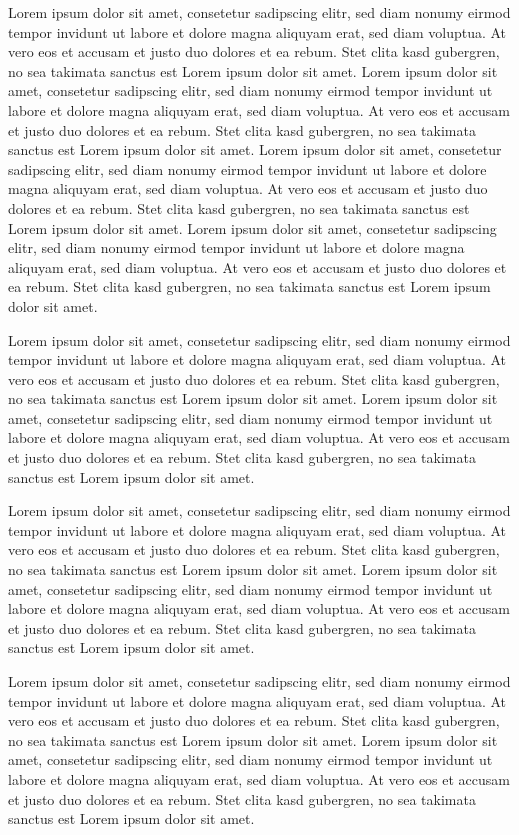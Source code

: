 \documentclass[11pt,a4paper]{article} %
\begin{document}
Lorem ipsum dolor sit amet, consetetur sadipscing elitr, sed diam nonumy eirmod tempor invidunt ut labore et dolore magna aliquyam erat, sed diam voluptua. At vero eos et accusam et justo duo dolores et ea rebum. Stet clita kasd gubergren, no sea takimata sanctus est Lorem ipsum dolor sit amet. Lorem ipsum dolor sit amet, consetetur sadipscing elitr, sed diam nonumy eirmod tempor invidunt ut labore et dolore magna aliquyam erat, sed diam voluptua. At vero eos et accusam et justo duo dolores et ea rebum. Stet clita kasd gubergren, no sea takimata sanctus est Lorem ipsum dolor sit amet. Lorem ipsum dolor sit amet, consetetur sadipscing elitr, sed diam nonumy eirmod tempor invidunt ut labore et dolore magna aliquyam erat, sed diam voluptua. At vero eos et accusam et justo duo dolores et ea rebum. Stet clita kasd gubergren, no sea takimata sanctus est Lorem ipsum dolor sit amet. Lorem ipsum dolor sit amet, consetetur sadipscing elitr, sed diam nonumy eirmod tempor invidunt ut labore et dolore magna aliquyam erat, sed diam voluptua. At vero eos et accusam et justo duo dolores et ea rebum. Stet clita kasd gubergren, no sea takimata sanctus est Lorem ipsum dolor sit amet. 

Lorem ipsum dolor sit amet, consetetur sadipscing elitr, sed diam nonumy eirmod tempor invidunt ut labore et dolore magna aliquyam erat, sed diam voluptua. At vero eos et accusam et justo duo dolores et ea rebum. Stet clita kasd gubergren, no sea takimata sanctus est Lorem ipsum dolor sit amet. Lorem ipsum dolor sit amet, consetetur sadipscing elitr, sed diam nonumy eirmod tempor invidunt ut labore et dolore magna aliquyam erat, sed diam voluptua. At vero eos et accusam et justo duo dolores et ea rebum. Stet clita kasd gubergren, no sea takimata sanctus est Lorem ipsum dolor sit amet. 

Lorem ipsum dolor sit amet, consetetur sadipscing elitr, sed diam nonumy eirmod tempor invidunt ut labore et dolore magna aliquyam erat, sed diam voluptua. At vero eos et accusam et justo duo dolores et ea rebum. Stet clita kasd gubergren, no sea takimata sanctus est Lorem ipsum dolor sit amet. Lorem ipsum dolor sit amet, consetetur sadipscing elitr, sed diam nonumy eirmod tempor invidunt ut labore et dolore magna aliquyam erat, sed diam voluptua. At vero eos et accusam et justo duo dolores et ea rebum. Stet clita kasd gubergren, no sea takimata sanctus est Lorem ipsum dolor sit amet. 

Lorem ipsum dolor sit amet, consetetur sadipscing elitr, sed diam nonumy eirmod tempor invidunt ut labore et dolore magna aliquyam erat, sed diam voluptua. At vero eos et accusam et justo duo dolores et ea rebum. Stet clita kasd gubergren, no sea takimata sanctus est Lorem ipsum dolor sit amet. Lorem ipsum dolor sit amet, consetetur sadipscing elitr, sed diam nonumy eirmod tempor invidunt ut labore et dolore magna aliquyam erat, sed diam voluptua. At vero eos et accusam et justo duo dolores et ea rebum. Stet clita kasd gubergren, no sea takimata sanctus est Lorem ipsum dolor sit amet. 
\end{document}

